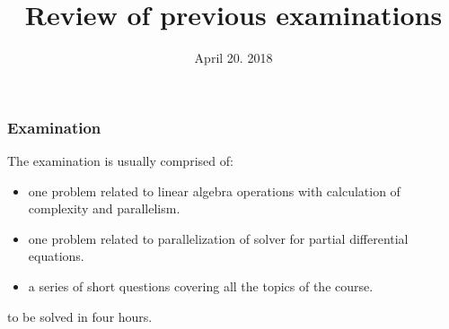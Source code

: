 

\newcommand{\xR}{\mathbb{R}}
\newcommand{\xRd}{{\xR^d}}
\newcommand{\xRN}{{\xR^N}}
\newcommand{\xMNR}{{M_N(\xR)}}
\newcommand{\bb}{{\boldsymbol b}}
\newcommand{\ee}{{\boldsymbol e}}
\newcommand{\ev}{{\boldsymbol \epsilon}}
\newcommand{\rr}{{\boldsymbol r}}
\newcommand{\xx}{{\boldsymbol x}}
\newcommand{\hx}{\hat{\boldsymbol x}}
\newcommand{\yy}{{\boldsymbol y}}
\newcommand{\vv}{{\boldsymbol v}}
\newcommand{\ww}{{\boldsymbol w}}
\newcommand{\zz}{{\boldsymbol z}}
\renewcommand{\mA}{{\mathrm A}}
\newcommand{\mB}{{\mathrm B}}
\newcommand{\mC}{{\mathrm C}}
\newcommand{\mD}{{\mathrm D}}
\newcommand{\mG}{{\mathrm G}}
\newcommand{\mH}{{\mathrm H}}
\renewcommand{\mL}{{\mathrm L}}
\newcommand{\mLs}{{\mathrm L_0}}
\newcommand{\mM}{{\mathrm M}}
\newcommand{\mRs}{{\mathrm R_0}}
\newcommand{\mR}{{\mathrm R}}
\newcommand{\mP}{{\mathrm P}}
\newcommand{\mQ}{{\mathrm Q}}
\newcommand{\mU}{{\mathrm U}}
\newcommand{\mId}{{\mathbf{Id}}}
\newcommand{\mII}{{\mathbf{\mathbb{I}}}}
\newcommand{\Seq}[1]{\bigl(#1\bigr)}
\newcommand{\Cond}[1]{\mathcal{C}(#1)}
\newcommand{\Order}[1]{\mathcal{O}\left(#1\right)}
\newcommand{\norm}[1]{{\lVert #1 \rVert}}
\newcommand{\norminf}[1]{\norm{#1}_{\infty}}

\newcommand{\InnerK}[2]{{{\mathbf\langle}\;#1\:,\: #2 \;{\rangle}}}
\newcommand{\Inner}[2]{{{\scriptstyle\mathbf{(}}\;#1\:,\: #2 \;{\scriptstyle\mathbf{)}}}}


\newtheorem{ex}{Question}


\title{Review of previous examinations}
\date{April 20. 2018}

\maketitle


\begin{frame}
  \frametitle{Examination}

The examination is usually comprised of:
\begin{itemize}
\item one problem related to linear algebra operations with calculation of complexity and parallelism.
\item one problem related to parallelization of solver for partial differential equations.
\item a series of short questions covering all the topics of the course.
\end{itemize}
to be solved in four hours.

\end{frame}

